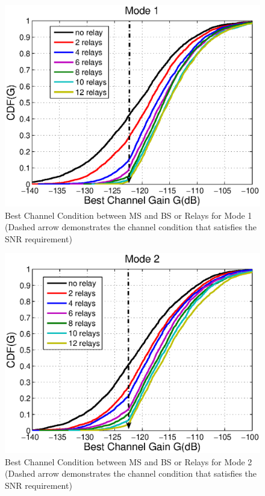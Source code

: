 \begin{figure}
\centering
\includegraphics[width=12cm]{Mode1_bestchannelgain_V2.eps}
\caption{Best Channel Condition between MS and BS or Relays for Mode 1 (Dashed arrow demonstrates the channel condition that satisfies the SNR requirement)}
\label{2:Mode1}
\end{figure}
\begin{figure}
\centering
\includegraphics[width=12cm]{Mode2_bestchannelgain_V2.eps}
\caption{Best Channel Condition between MS and BS or Relays for Mode 2 (Dashed arrow demonstrates the channel condition that satisfies the SNR requirement)}
\label{2:Mode2}
\end{figure}
